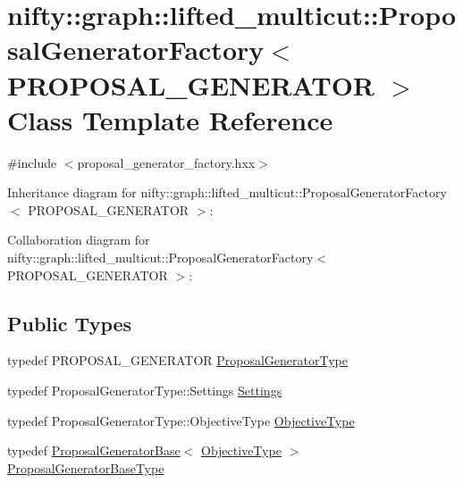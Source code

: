 \hypertarget{classnifty_1_1graph_1_1lifted__multicut_1_1ProposalGeneratorFactory}{}\section{nifty\+:\+:graph\+:\+:lifted\+\_\+multicut\+:\+:Proposal\+Generator\+Factory$<$ P\+R\+O\+P\+O\+S\+A\+L\+\_\+\+G\+E\+N\+E\+R\+A\+T\+O\+R $>$ Class Template Reference}
\label{classnifty_1_1graph_1_1lifted__multicut_1_1ProposalGeneratorFactory}


{\ttfamily \#include $<$proposal\+\_\+generator\+\_\+factory.\+hxx$>$}



Inheritance diagram for nifty\+:\+:graph\+:\+:lifted\+\_\+multicut\+:\+:Proposal\+Generator\+Factory$<$ P\+R\+O\+P\+O\+S\+A\+L\+\_\+\+G\+E\+N\+E\+R\+A\+T\+O\+R $>$\+:


Collaboration diagram for nifty\+:\+:graph\+:\+:lifted\+\_\+multicut\+:\+:Proposal\+Generator\+Factory$<$ P\+R\+O\+P\+O\+S\+A\+L\+\_\+\+G\+E\+N\+E\+R\+A\+T\+O\+R $>$\+:
\subsection*{Public Types}
\begin{DoxyCompactItemize}
\item 
typedef P\+R\+O\+P\+O\+S\+A\+L\+\_\+\+G\+E\+N\+E\+R\+A\+T\+O\+R \hyperlink{classnifty_1_1graph_1_1lifted__multicut_1_1ProposalGeneratorFactory_a87247429e94105d08e96fd52e5961c64}{Proposal\+Generator\+Type}
\item 
typedef Proposal\+Generator\+Type\+::\+Settings \hyperlink{classnifty_1_1graph_1_1lifted__multicut_1_1ProposalGeneratorFactory_a6f4c9b45a807a41e2c5dbe44909c0c2b}{Settings}
\item 
typedef Proposal\+Generator\+Type\+::\+Objective\+Type \hyperlink{classnifty_1_1graph_1_1lifted__multicut_1_1ProposalGeneratorFactory_a789533e467109de4f8fac864a94fbef0}{Objective\+Type}
\item 
typedef \hyperlink{classnifty_1_1graph_1_1lifted__multicut_1_1ProposalGeneratorBase}{Proposal\+Generator\+Base}$<$ \hyperlink{classnifty_1_1graph_1_1lifted__multicut_1_1ProposalGeneratorFactory_a789533e467109de4f8fac864a94fbef0}{Objective\+Type} $>$ \hyperlink{classnifty_1_1graph_1_1lifted__multicut_1_1ProposalGeneratorFactory_ab94414f71f53f55f8dbf9428c80bc9d1}{Proposal\+Generator\+Base\+Type}
\end{DoxyCompactItemize}
